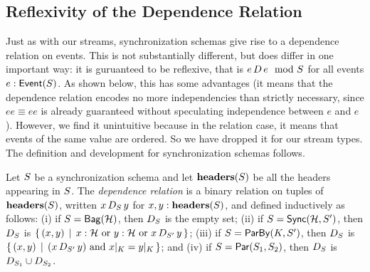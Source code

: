 \subsection{Reflexivity of the Dependence Relation}

Just as with our streams, synchronization schemas give rise to a dependence relation on events.
This is not substantially different, but does differ in one important way: it is guruanteed to be reflexive, that is $\deptype{e}{e}{S}$ for all events $\eventtype{e}{S}$.
As shown below, this has some advantages (it means that the dependence relation encodes no more independencies than strictly necessary, since $ee \equiv ee$ is already guaranteed without speculating independence between $e$ and $e$).
However, we find it unintuitive because in the relation case, it means that events of the same value are ordered. So we have dropped it for our stream types.
The definition and development for synchronization schemas follows.

\begin{definition}
\label{45:def:dep-relation}
Let $\ss$ be a synchronization schema and let $\headers(\ss)$ be all the headers appearing in $\ss$.
The \emph{dependence relation} is a binary relation on tuples of $\headers(\ss)$, written $x\, D_{\ss}\, y$ for $x, y: \headers(\ss)$, and defined inductively as follows:
(i) if $\ss = \relleaf{\mathcal{H}}$, then $D_{\ss}$ is the empty set;
(ii) if $\ss = \hier{\mathcal{H}}{\ss'}$, then
$D_{\ss}$ is $\{\, (x, y)\,\mid\,
    x : \mathcal{H}
    \text{ or } y : \mathcal{H}
    \text{ or } x\, D_{\ss'}\, y\,\}$;
(iii) if $\ss = \keyby{K}{\ss'}$, then
$D_{\ss}$ is $\{\, (x, y) \,\mid\,
    (x\, D_{\ss'}\, y) \text{ and } \tuprestrict{x}{K} = \tuprestrict{y}{K}\,\}$; and
(iv) if $\ss = \parcomp{\ss_1}{\ss_2}$, then
$D_{\ss}$ is $D_{\ss_1} \cup D_{\ss_2}$.
\end{definition}

